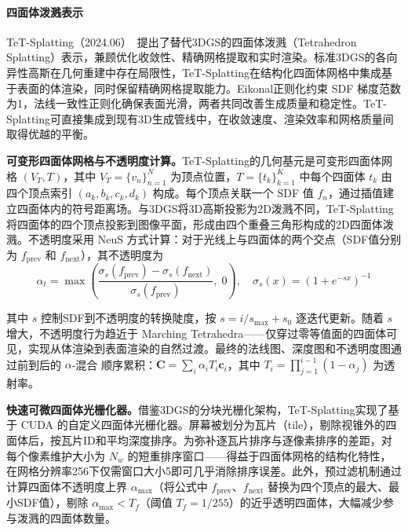\paragraph{四面体泼溅表示}

TeT-Splatting（2024.06）~\cite{2406_01579}提出了替代3DGS的四面体泼溅（Tetrahedron Splatting）表示，兼顾优化收敛性、精确网格提取和实时渲染。标准3DGS的各向异性高斯在几何重建中存在局限性，TeT-Splatting在结构化四面体网格中集成基于表面的体渲染，同时保留精确网格提取能力。Eikonal正则化约束 SDF 梯度范数为1，法线一致性正则化确保表面光滑，两者共同改善生成质量和稳定性。TeT-Splatting可直接集成到现有3D生成管线中，在收敛速度、渲染效率和网格质量间取得优越的平衡。

\textbf{可变形四面体网格与不透明度计算。}TeT-Splatting的几何基元是可变形四面体网格 $(V_T, T)$，其中 $V_T = \{v_n\}_{n=1}^{N}$ 为顶点位置，$T = \{t_k\}_{k=1}^{K}$ 中每个四面体 $t_k$ 由四个顶点索引 $(a_k, b_k, c_k, d_k)$ 构成。每个顶点关联一个 SDF 值 $f_n$，通过插值建立四面体内的符号距离场。与3DGS将3D高斯投影为2D泼溅不同，TeT-Splatting将四面体的四个顶点投影到图像平面，形成由四个重叠三角形构成的2D四面体泼溅。不透明度采用 NeuS 方式计算：对于光线上与四面体的两个交点（SDF值分别为 $f_{\text{prev}}$ 和 $f_{\text{next}}$），其不透明度为
\begin{equation}
\alpha_t = \max\left(\frac{\sigma_s(f_{\text{prev}}) - \sigma_s(f_{\text{next}})}{\sigma_s(f_{\text{prev}})}, \; 0\right), \quad \sigma_s(x) = (1 + e^{-sx})^{-1}
\end{equation}

其中 $s$ 控制SDF到不透明度的转换陡度，按 $s = i/s_{\max} + s_0$ 逐迭代更新。随着 $s$ 增大，不透明度行为趋近于 Marching Tetrahedra——仅穿过零等值面的四面体可见，实现从体渲染到表面渲染的自然过渡。最终的法线图、深度图和不透明度图通过前到后的 $\alpha$-混合 顺序累积：$\mathbf{C} = \sum_i \alpha_i T_i \mathbf{c}_i$，其中 $T_i = \prod_{j=1}^{i-1}(1 - \alpha_j)$ 为透射率。

\textbf{快速可微四面体光栅化器。}借鉴3DGS的分块光栅化架构，TeT-Splatting实现了基于 CUDA 的自定义四面体光栅化器。屏幕被划分为瓦片（tile），剔除视锥外的四面体后，按瓦片ID和平均深度排序。为弥补逐瓦片排序与逐像素排序的差距，对每个像素维护大小为 $N_w$ 的短重排序窗口——得益于四面体网格的结构化特性，在网格分辨率256下仅需窗口大小5即可几乎消除排序误差。此外，预过滤机制通过计算四面体不透明度上界 $\alpha_{\max}$（将公式中 $f_{\text{prev}}$、$f_{\text{next}}$ 替换为四个顶点的最大、最小SDF值），剔除 $\alpha_{\max} < T_f$（阈值 $T_f = 1/255$）的近乎透明四面体，大幅减少参与泼溅的四面体数量。

